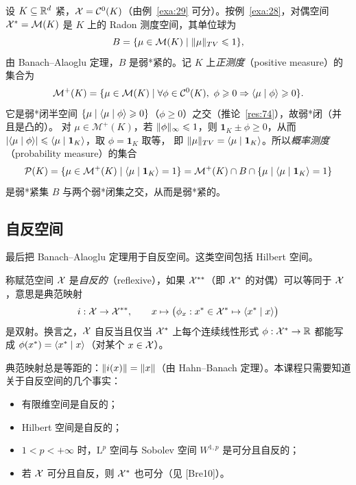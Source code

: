 \begin{example}[概率测度]
\label{exa:30}
设 $K\subseteq\mathbb{R}^d$ 紧，$\mathcal{X}=\mathcal{C}^0(K)$（由例~\ref{exa:29} 可分）。按例~\ref{exa:28}，对偶空间 $\mathcal{X}^{*}=\mathcal{M}(K)$ 是 $K$ 上的 Radon 测度空间，其单位球为
\[
  B=\{\mu\in\mathcal{M}(K)\mid\lVert \mu\rVert_{TV}\leqslant1\},
\]
由 Banach--Alaoglu 定理，$B$ 是弱*紧的。记 $K$ 上\emph{正测度}（positive measure）的集合为
\[
  \mathcal{M}^+(K)=\{\mu\in\mathcal{M}(K)\mid\forall\phi\in\mathcal{C}^0(K),\ \phi\geqslant0\Rightarrow\pair{\mu}{\phi}\geqslant0\}.
\]
它是弱*闭半空间 $\{\mu\mid\langle \mu \mid \phi\rangle\geqslant0\}$（$\phi\geqslant0$）之交（推论~\ref{res:74}），故弱*闭（并且是凸的）。
对 $\mu\in\mathcal{M}^+(K)$，若 $\lVert \phi\rVert_\infty\leqslant1$，则 $\mathbf{1}_K\pm\phi\geqslant0$，从而 $\lvert \langle \mu \mid \phi\rangle\rvert\leqslant\langle \mu \mid \mathbf{1}_K\rangle$，取 $\phi=\mathbf{1}_K$ 取等，
即 $\lVert \mu\rVert_{TV}=\langle \mu \mid \mathbf{1}_K\rangle$。所以\emph{概率测度}（probability measure）的集合
\[
  \mathcal{P}(K)=\{\mu\in\mathcal{M}^+(K)\mid\langle \mu \mid \mathbf{1}_K\rangle=1\}=\mathcal{M}^+(K)\cap B\cap\{\mu\mid\langle \mu \mid \mathbf{1}_K\rangle=1\}
\]
是弱*紧集 $B$ 与两个弱*闭集之交，从而是弱*紧的。
\end{example}

\subsection{自反空间}

最后把 Banach--Alaoglu 定理用于自反空间。这类空间包括 Hilbert 空间。

\begin{definition}[自反空间]
\label{def:41}
称赋范空间 $\mathcal{X}$ 是\emph{自反的}（reflexive），如果 $\mathcal{X}^{**}$（即 $\mathcal{X}^{*}$ 的对偶）可以等同于 $\mathcal{X}$，意思是典范映射
\[
  i:\mathcal{X}\to\mathcal{X}^{**},\qquad x\mapsto\bigl(\phi_x:x^*\in\mathcal{X}^{*}\mapsto\langle x^* \mid x\rangle\bigr)
\]
是双射。换言之，$\mathcal{X}$ 自反当且仅当 $\mathcal{X}^{*}$ 上每个连续线性形式 $\phi:\mathcal{X}^{*}\to\mathbb{R}$ 都能写成 $\phi(x^*)=\langle x^* \mid x\rangle$（对某个 $x\in\mathcal{X}$）。
\end{definition}

典范映射总是等距的：$\lVert i(x)\rVert=\lVert x\rVert$（由 Hahn--Banach 定理）。本课程只需要知道关于自反空间的几个事实：
\begin{itemize}
  \item 有限维空间是自反的；
  \item Hilbert 空间是自反的；
  \item $1<p<+\infty$ 时，$\mathrm{L}^p$ 空间与 Sobolev 空间 $W^{1,p}$ 是可分且自反的；
  \item 若 $\mathcal{X}$ 可分且自反，则 $\mathcal{X}^{*}$ 也可分（见 [Bre10]）。
\end{itemize}

